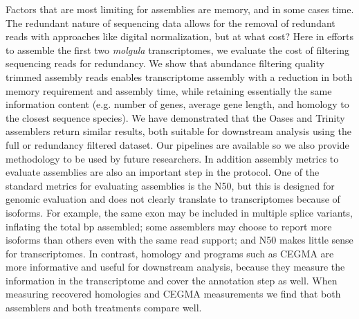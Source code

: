 Factors that are most limiting for assemblies are memory, and in some cases time. The redundant nature of sequencing data allows for the removal of redundant reads with approaches like digital normalization, but at what cost? Here in efforts to assemble the first two \textit{molgula} transcriptomes, we evaluate the cost of filtering sequencing reads for redundancy. We show that abundance filtering quality trimmed assembly reads enables transcriptome assembly with a reduction in both memory requirement and assembly time, while retaining essentially the same information content (e.g. number of genes, average gene length, and homology to the closest sequence species). We have demonstrated that the Oases and Trinity assemblers return similar results, both suitable for downstream analysis using the full or redundancy filtered dataset. Our pipelines are available so we also provide methodology to be used by future researchers. In addition assembly metrics to evaluate assemblies are also an important step in the protocol. One of the standard metrics for evaluating assemblies is the N50, but this is designed for genomic evaluation and does not clearly translate to transcriptomes because of isoforms. For example, the same exon may be included in multiple splice variants, inflating the total bp assembled; some assemblers may choose to report more isoforms than others even with the same read support; and N50 makes little sense for transcriptomes. In contrast, homology and programs such as CEGMA are more informative and useful for downstream analysis, because they measure the information in the transcriptome and cover the annotation step as well. When measuring recovered homologies and CEGMA measurements we find that both assemblers and both treatments compare well. %

